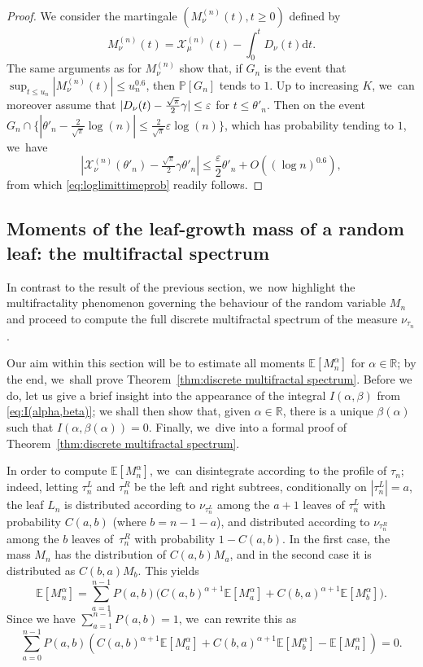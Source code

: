 \documentclass[11pt]{article}
\newcommand{\Xmun}{\mathcal{X}^{(n)}_{\mu}}
\newcommand{\Xnun}{\mathcal{X}^{(n)}_{\nu}}
\newcommand{\E}{\mathbb{E}}
\newcommand{\R}{{\mathbb{R}}}
\newcommand{\pr}{\mathbb{P}}
\let\veps\varepsilon
\theoremstyle{definition}
\begin{document}
\begin{proof}
We consider the martingale $(M^{(n)}_{\nu}(t),t\geq 0)$ defined by
\[
M^{(n)}_{\nu}(t)=\Xmun(t)-\int_0^t D_{\nu}(t)\mathrm dt.
\]
The same arguments as for $M^{(n)}_{\nu}$ show that, if $G_n$ is the event that $\sup_{t\leq u_n} |M^{(n)}_{\nu}(t)| \leq u_n^{0.6}$, then $\pr[G_n]$ tends to $1$. Up to increasing $K$, we~can moreover assume that $|D_{\nu}(t)-\nobreak\frac{\sqrt{\pi}}{2}\gamma|\leq \veps$ for $t\leq \theta'_n$. Then on the event $G_n\cap\{|\theta'_n-\frac{2}{\sqrt{\pi}}\log(n)|\leq \frac{2}{\sqrt{\pi}}\veps\log(n)\}$, which has probability tending to $1$, we~have
\[
|\Xnun(\theta'_n)-\tfrac{\sqrt{\pi}}{2}\gamma\theta'_n|\leq \frac{\veps}{2}\theta'_n+O((\log n)^{0.6}),
\]
from which \eqref{eq:loglimittimeprob} readily follows.
\end{proof}

\subsection{Moments of the leaf-growth mass of a random leaf: the multifractal spectrum}\label{section:multifractal spectrum}
In contrast to the result of the previous section, we~now highlight the multifractality phenomenon governing the behaviour of the random variable $M_n$ and proceed to compute the full discrete multifractal spectrum of the measure $\nu_{\tau_n}$.

Our aim within this section will be to estimate all moments $\E[M_n^\alpha]$ for $\alpha\in\R$; by the end, we~shall prove Theorem~\ref{thm:discrete multifractal spectrum}. Before we do, let us give a brief insight into the appearance of the integral $I(\alpha,\beta)$ from \eqref{eq:I(alpha,beta)}; we shall then show that, given $\alpha\in\R$, there is a unique $\beta(\alpha)$ such that $I(\alpha,\beta(\alpha))=0$. Finally, we~dive into a formal proof of Theorem~\ref{thm:discrete multifractal spectrum}.

In order to compute $\E[M_n^\alpha]$, we~can disintegrate according to the profile of $\tau_n$; indeed, letting $\tau_n^L$ and $\tau_n^R$ be the left and right subtrees, conditionally on $|\tau_n^L|=a$, the leaf $L_n$ is distributed according to $\nu_{\tau_n^L}$ among the $a+1$ leaves of $\tau_n^L$ with probability $C(a,b)$ (where $b=n-1-a$), and distributed according to $\nu_{\tau_n^R}$ among the $b$ leaves of~$\tau_n^R$ with probability $1-C(a,b)$. In the first case, the mass $M_n$ has the distribution of $C(a,b)M_a$, and in the second case it is distributed as $C(b,a)M_{b}$. This yields
\[
\E[M_n^\alpha]=\sum_{a=1}^{n-1}P(a,b)\bigl(C(a,b)^{\alpha+1}\E[M_a^\alpha]+C(b,a)^{\alpha+1}\E[M_b^\alpha]\bigr).
\]
Since we have $\sum_{a=1}^{n-1}P(a,b)=1$, we~can rewrite this as
\[
\sum_{a=0}^{n-1}P(a,b)\left(C(a,b)^{\alpha+1} \E[M_a^\alpha]+C(b,a)^{\alpha+1} \E[M_b^\alpha]-\E[M_n^\alpha]\right)=0.
\]
\end{document}

